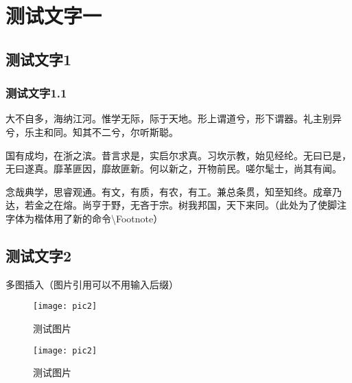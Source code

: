 \documentclass{zjureport}
\date{\today}
\begin{document}
    \makeheader

    \section{测试文字一}
        \subsection{测试文字1}
        \subsubsection{测试文字1.1}
        大不自多，海纳江河。惟学无际，际于天地。形上谓道兮，形下谓器。礼主别异兮，乐主和同。知其不二兮，尔听斯聪。\par
        国有成均，在浙之滨。昔言求是，实启尔求真。习坎示教，始见经纶。无曰已是，无曰遂真。靡革匪因，靡故匪新。何以新之，开物前民。嗟尔髦士，尚其有闻。\par
        念哉典学，思睿观通。有文，有质，有农，有工。兼总条贯，知至知终。成章乃达，若金之在熔。尚亨于野，无吝于宗。树我邦国，天下来同。（此处为了使脚注字体为楷体用了新的命令\textbackslash Footnote）
        \subsection{测试文字2}
        多图插入（图片引用可以不用输入后缀）
        \begin{figure}[htbp]
            \centering
            \begin{minipage}[t]{0.48\textwidth}
                \centering
                \texttt{[image: pic2]}
                \caption{测试图片}
            \end{minipage}
            \begin{minipage}[t]{0.48\textwidth}
                \centering
                \texttt{[image: pic2]}
                \caption{测试图片}
            \end{minipage}
        \end{figure}
\end{document}
